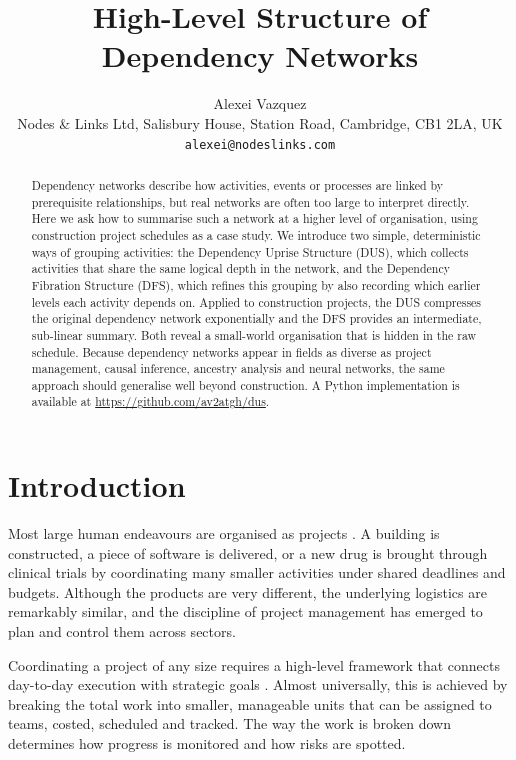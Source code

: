 \documentclass[11pt,a4paper]{article}
\title{High-Level Structure of Dependency Networks}
\author{Alexei Vazquez\\
\small Nodes \& Links Ltd, Salisbury House, Station Road, Cambridge, CB1 2LA, UK\\
\small \texttt{alexei@nodeslinks.com}}
\date{}
\begin{document}
\maketitle

\begin{abstract}
Dependency networks describe how activities, events or processes are linked by prerequisite relationships, but real networks are often too large to interpret directly. Here we ask how to summarise such a network at a higher level of organisation, using construction project schedules as a case study. We introduce two simple, deterministic ways of grouping activities: the Dependency Uprise Structure (DUS), which collects activities that share the same logical depth in the network, and the Dependency Fibration Structure (DFS), which refines this grouping by also recording which earlier levels each activity depends on. Applied to construction projects, the DUS compresses the original dependency network exponentially and the DFS provides an intermediate, sub-linear summary. Both reveal a small-world organisation that is hidden in the raw schedule. Because dependency networks appear in fields as diverse as project management, causal inference, ancestry analysis and neural networks, the same approach should generalise well beyond construction. A Python implementation is available at \url{https://github.com/av2atgh/dus}.
\end{abstract}

\section*{Introduction}

Most large human endeavours are organised as projects \cite{jensen16, schoper2017projectification, wagner2021projectification}. A building is constructed, a piece of software is delivered, or a new drug is brought through clinical trials by coordinating many smaller activities under shared deadlines and budgets. Although the products are very different, the underlying logistics are remarkably similar, and the discipline of project management has emerged to plan and control them across sectors.

Coordinating a project of any size requires a high-level framework that connects day-to-day execution with strategic goals \cite{pmi2021pmbok, taxen2011system}. Almost universally, this is achieved by breaking the total work into smaller, manageable units that can be assigned to teams, costed, scheduled and tracked. The way the work is broken down determines how progress is monitored and how risks are spotted.
\end{document}
